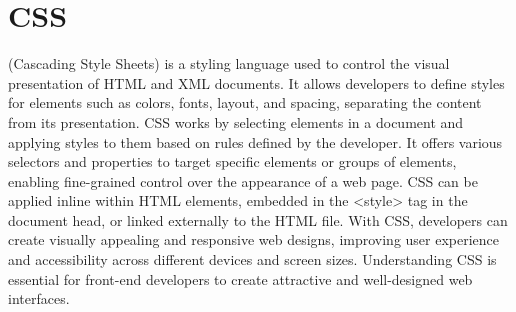 \chapter{CSS}
\thispagestyle{fancy}
\lstset{}\lstset{language=CSS, style=cssstyle}

 (Cascading Style Sheets) is a styling language used to control the visual presentation of HTML and XML documents. It allows developers to define styles for elements such as colors, fonts, layout, and spacing, separating the content from its presentation. CSS works by selecting elements in a document and applying styles to them based on rules defined by the developer. It offers various selectors and properties to target specific elements or groups of elements, enabling fine-grained control over the appearance of a web page. CSS can be applied inline within HTML elements, embedded in the <style> tag in the document head, or linked externally to the HTML file. With CSS, developers can create visually appealing and responsive web designs, improving user experience and accessibility across different devices and screen sizes. Understanding CSS is essential for front-end developers to create attractive and well-designed web interfaces.
